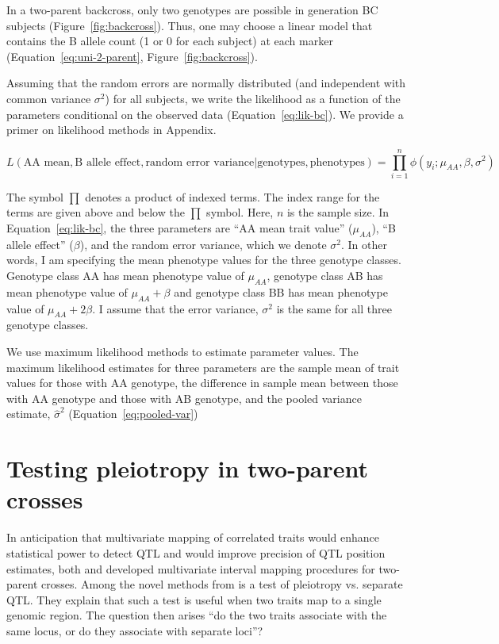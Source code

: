 \documentclass[oneside]{book}\usepackage[]{graphicx}\usepackage[]{color}
\begin{document}
In a two-parent backcross, only two genotypes are possible in 
generation BC subjects (Figure~\ref{fig:backcross}). 
Thus, one may choose a linear model that contains 
the B allele count (1 or 0 for each subject) at each marker
(Equation~\ref{eq:uni-2-parent}, Figure~\ref{fig:backcross}).


Assuming that the random errors are normally distributed (and independent with common
variance $\sigma^2$) for all subjects, we write the likelihood as
a function of the parameters conditional on the observed
data (Equation~\ref{eq:lik-bc}). We provide a primer on likelihood methods in Appendix. 

\begin{equation}
L(\text{AA mean}, \text{B allele effect}, \text{random error variance}| \text{genotypes}, \text{phenotypes}) = \prod_{i=1}^n \phi(y_i; \mu_{AA}, \beta, \sigma^2)
\label{eq:lik-bc}
\end{equation}

The symbol $\prod$ denotes a product of indexed terms.
The index range for the terms are given above and below the $\prod$ symbol. 
Here, $n$ is the sample size.
In Equation~\ref{eq:lik-bc}, the three parameters are ``AA mean trait value'' 
($\mu_{AA}$), ``B allele effect'' ($\beta$), and the random error
variance, which we denote $\sigma^2$. In other words, I am specifying the 
mean phenotype values for the three genotype classes. Genotype class AA has 
mean phenotype value of $\mu_{AA}$, genotype class AB has mean phenotype
value of $\mu_{AA} + \beta$ and genotype class BB has mean 
phenotype value of $\mu_{AA} + 2\beta$. I assume that the error variance, $\sigma^2$ 
is the same for all three genotype classes.

We use maximum likelihood
methods to estimate parameter values. The maximum likelihood estimates
for three parameters are the sample mean of trait values for those with
AA genotype, the difference in sample mean between those with AA
genotype and those with AB genotype, and the pooled variance estimate,
$\widehat\sigma^2$ (Equation~\ref{eq:pooled-var})


\section{Testing pleiotropy in two-parent crosses}\label{sec:pleiotropy-two-parent}

In anticipation that multivariate mapping of correlated traits would enhance statistical
power to detect QTL and would improve precision of QTL position estimates,
both \citet{jiang1995multiple} and \citet{korol1995interval} developed
multivariate interval mapping procedures for two-parent crosses. 
Among the novel methods from \citet{jiang1995multiple} is a test of pleiotropy vs. separate QTL.
They explain that such a test is useful when two traits map to a single genomic region.
The question then arises ``do the two traits associate with the same locus, 
or do they associate with separate loci''?
\end{document}
